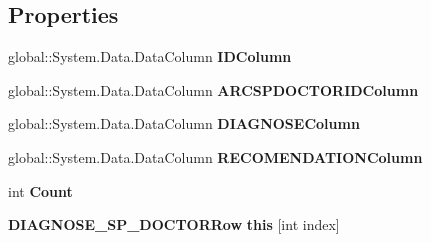 \subsection*{Properties}
\begin{CompactItemize}
\item 
global::System.Data.DataColumn \textbf{IDColumn}\hspace{0.3cm}{\tt  [get]}\label{class_automatic_medical_system_1_1_data_set2_1_1_d_i_a_g_n_o_s_e___s_p___d_o_c_t_o_r_data_table_a3580d4689cde1317a71079caaa9432d}

\item 
global::System.Data.DataColumn \textbf{ARCSPDOCTORIDColumn}\hspace{0.3cm}{\tt  [get]}\label{class_automatic_medical_system_1_1_data_set2_1_1_d_i_a_g_n_o_s_e___s_p___d_o_c_t_o_r_data_table_a2f12d1afa61b2dc8458d6d19bac9772}

\item 
global::System.Data.DataColumn \textbf{DIAGNOSEColumn}\hspace{0.3cm}{\tt  [get]}\label{class_automatic_medical_system_1_1_data_set2_1_1_d_i_a_g_n_o_s_e___s_p___d_o_c_t_o_r_data_table_ceab22b0ca2c98218d2819ad6e91b34a}

\item 
global::System.Data.DataColumn \textbf{RECOMENDATIONColumn}\hspace{0.3cm}{\tt  [get]}\label{class_automatic_medical_system_1_1_data_set2_1_1_d_i_a_g_n_o_s_e___s_p___d_o_c_t_o_r_data_table_d55c000e326b713de529e2bacab2f134}

\item 
int \textbf{Count}\hspace{0.3cm}{\tt  [get]}\label{class_automatic_medical_system_1_1_data_set2_1_1_d_i_a_g_n_o_s_e___s_p___d_o_c_t_o_r_data_table_b69875ab1aec602853fc5b9a95873186}

\item 
{\bf DIAGNOSE\_\-SP\_\-DOCTORRow} \textbf{this} [int index]\hspace{0.3cm}{\tt  [get]}\label{class_automatic_medical_system_1_1_data_set2_1_1_d_i_a_g_n_o_s_e___s_p___d_o_c_t_o_r_data_table_eb2d06de88e8ec6375402fa831ac6c8c}

\end{CompactItemize}
